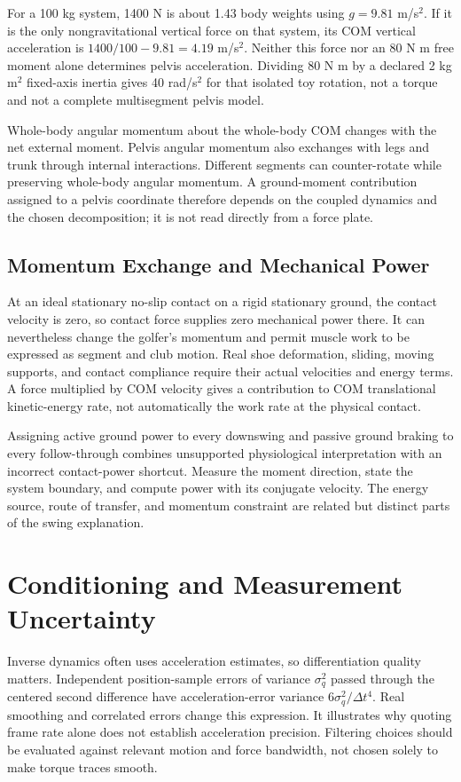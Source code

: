 For a 100 kg system, 1400 N is about 1.43 body weights using $g=9.81$ m/s$^2$.
If it is the only nongravitational vertical force on that system, its COM
vertical acceleration is $1400/100-9.81=4.19$ m/s$^2$. Neither this force nor
an 80 N m free moment alone determines pelvis acceleration. Dividing 80 N m
by a declared 2 kg m$^2$ fixed-axis inertia gives 40 rad/s$^2$ for that isolated
toy rotation, not a torque and not a complete multisegment pelvis model.

Whole-body angular momentum about the whole-body COM changes with the net
external moment. Pelvis angular momentum also exchanges with legs and trunk
through internal interactions. Different segments can counter-rotate while
preserving whole-body angular momentum. A ground-moment contribution assigned
to a pelvis coordinate therefore depends on the coupled dynamics and the
chosen decomposition; it is not read directly from a force plate.

\subsection{Momentum Exchange and Mechanical Power}

At an ideal stationary no-slip contact on a rigid stationary ground, the contact
velocity is zero, so contact force supplies zero mechanical power there. It
can nevertheless change the golfer's momentum and permit muscle work to be
expressed as segment and club motion. Real shoe deformation, sliding, moving
supports, and contact compliance require their actual velocities and energy
terms. A force multiplied by COM velocity gives a contribution to COM
translational kinetic-energy rate, not automatically the work rate at the
physical contact.

Assigning active ground power to every downswing and passive ground braking
to every follow-through combines unsupported physiological interpretation with
an incorrect contact-power shortcut. Measure the moment direction, state the
system boundary, and compute power with its conjugate velocity. The energy
source, route of transfer, and momentum constraint are related but distinct
parts of the swing explanation.

\section{Conditioning and Measurement Uncertainty}

Inverse dynamics often uses acceleration estimates, so differentiation quality
matters. Independent position-sample errors of variance $\sigma_q^2$ passed
through the centered second difference have acceleration-error variance
$6\sigma_q^2/\Delta t^4$. Real smoothing and correlated errors change this
expression. It illustrates why quoting frame rate alone does not establish
acceleration precision. Filtering choices should be evaluated against relevant
motion and force bandwidth, not chosen solely to make torque traces smooth.

